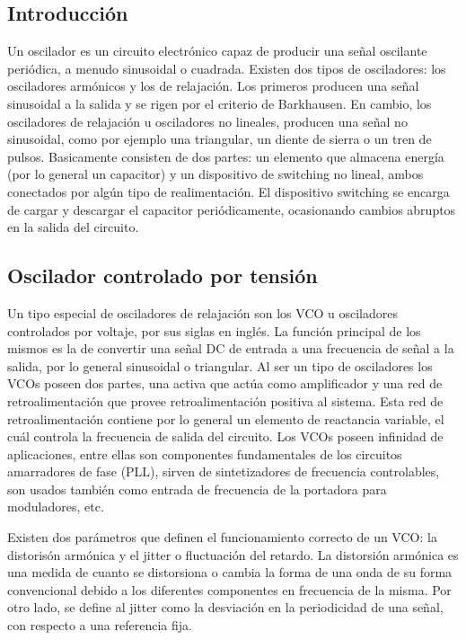 \subsection{Introducción}

Un oscilador es un circuito electrónico capaz de producir una señal oscilante periódica, a menudo sinusoidal o cuadrada. Existen dos tipos de osciladores: los osciladores armónicos y los de relajación. Los primeros producen una señal sinusoidal a la salida y se rigen por el criterio de Barkhausen. En cambio, los osciladores de relajación u osciladores no lineales, producen una señal no sinusoidal, como por ejemplo una triangular, un diente de sierra o un tren de pulsos. Basicamente consisten de dos partes: un elemento que almacena energía (por lo general un capacitor) y un dispositivo de switching no lineal, ambos conectados por algún tipo de realimentación. El dispositivo switching se encarga de cargar y descargar el capacitor periódicamente, ocasionando cambios abruptos en la salida del circuito. 


\subsection{Oscilador controlado por tensión}

Un tipo especial de osciladores de relajación son los VCO u osciladores controlados por voltaje, por sus siglas en inglés. La función principal de los mismos es la de convertir una señal DC de entrada a una frecuencia de señal a la salida, por lo general sinusoidal o triangular. Al ser un tipo de osciladores los VCOs poseen dos partes, una activa que actúa como amplificador y una red de retroalimentación que provee retroalimentación positiva al sistema. Esta red de retroalimentación contiene por lo general un elemento de reactancia variable, el cuál controla la frecuencia de salida del circuito. 
Los VCOs poseen infinidad de aplicaciones, entre ellas son componentes fundamentales de los circuitos amarradores de fase (PLL), sirven de sintetizadores de frecuencia controlables, son usados también como entrada de frecuencia de la portadora para moduladores, etc.


Existen dos par\'ametros que definen el funcionamiento correcto de un VCO: la distoris\'on arm\'onica y el jitter o fluctuaci\'on del retardo. La distorsi\'on arm\'onica es una medida de cuanto se distorsiona o cambia la forma de una onda de su forma convencional debido a los diferentes componentes en frecuencia de la misma. Por otro lado, se define al jitter como la desviaci\'on en la periodicidad de una señal, con respecto a una referencia fija. 


